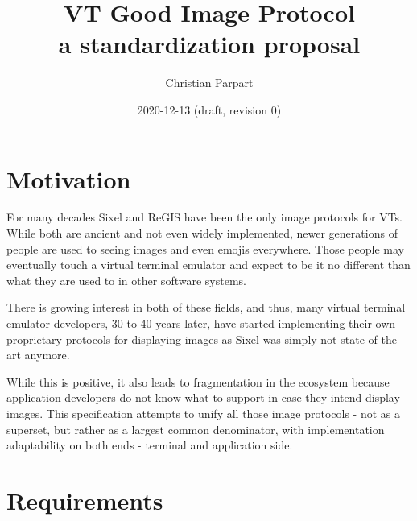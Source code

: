 \documentclass{article}
\title{VT Good Image Protocol \\
a standardization proposal}
\author{Christian Parpart}
\date{2020-12-13 (draft, revision 0)}
\begin{document}
\maketitle

\tableofcontents


\section{Motivation} %

For many decades Sixel and ReGIS have been the only image protocols for VTs. While both are
ancient and not even widely implemented, newer generations of people are used to seeing images
and even emojis everywhere. Those people may eventually touch a virtual terminal emulator
and expect to be it no different than what they are used to in other software systems.

There is growing interest in both of these fields, and thus, many virtual terminal emulator
developers, 30 to 40 years later, have started implementing their own proprietary protocols
for displaying images as Sixel was simply not state of the art anymore.

While this is positive, it also leads to fragmentation in the ecosystem because application
developers do not know what to support in case they intend display images.
This specification attempts to unify all those image protocols - not as a superset, but rather
as a largest common denominator, with implementation adaptability on both ends - terminal and
application side.

\section{Requirements} %
\end{document}
